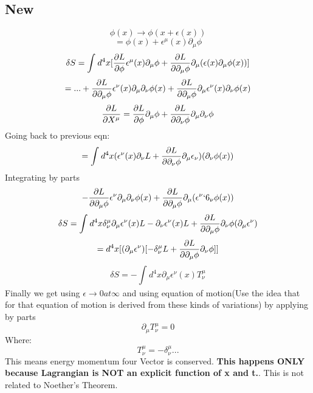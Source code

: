 \documentclass{scrartcl}
\begin{document}
\subsection{New}
\[ \phi(x) \rightarrow \phi(x + \epsilon(x)) \]
\[  = \phi(x) + \epsilon^\mu(x) \partial_\mu \phi \]
\[ \delta S = \displaystyle\int_{}^{} d^4 x [ \pdv{L}{\phi} \epsilon^\mu(x) \partial_\mu \phi + \pdv{L}{\partial_\mu \phi} \partial_\mu(\epsilon(x) \partial_\mu \phi(x))] \]
\[ = ... + \pdv{L}{\partial_\mu \phi} \epsilon^\nu(x) \partial_\mu \partial_\nu \phi(x) + \pdv{L}{\partial_\mu \phi} \partial_\mu \epsilon^\nu(x) \partial_\nu \phi(x) \]
\[ \pdv{L}{X^\mu} = \pdv{L}{\phi} \partial_\mu \phi + \pdv{L}{\partial_\nu \phi} \partial_\mu \partial_\nu \phi \]
Going back to previous eqn:
\[ = \displaystyle\int_{}^{} d^4 x (\epsilon^\nu(x) \partial_\nu L + \pdv{L}{\partial_\nu \phi} \partial_\mu \epsilon_\nu)(\partial_\nu \phi(x)) \]
Integrating by parts
\[ - \pdv{L}{\partial_\mu \phi} \epsilon^\nu \partial_\mu \partial_\nu \phi(x) + \pdv{L}{\partial_\mu \phi} \partial_\mu ( \epsilon^\nu `6_\nu \phi(x)) \]
\[ \delta S = \displaystyle\int_{}^{} d^4 x  \delta^\mu_\nu \partial_\mu \epsilon^\nu(x) L - \partial_\nu \epsilon^\nu(x) L + \pdv{L}{\partial_\mu \phi} \partial_\nu \phi(\partial_\mu \epsilon^\nu) \]
\[ = d^4 x [ (\partial_\mu \epsilon^\nu)[-\delta_\nu^\mu L + \pdv{L}{\partial_\mu \phi} \partial_\nu \phi]] \]
\[ \delta S = - \displaystyle\int_{}^{} d^4 x \partial_\mu \epsilon^\nu(x) T^\mu_\nu \]
Finally we get using \( \epsilon \rightarrow 0 at \infty \) and using equation of motion(Use the idea that for that equation of motion is derived from these kinds of variations) by applying by parts
\[ \partial_\mu T^\mu_\nu = 0 \]
Where:
\[ T^\mu_\nu = - \delta_\nu^\mu ... \]
This means energy momentum four Vector is conserved. \textbf{This happens ONLY because Lagrangian is NOT an explicit function of x and t.}. This is not related to Noether's Theorem.
\end{document}
